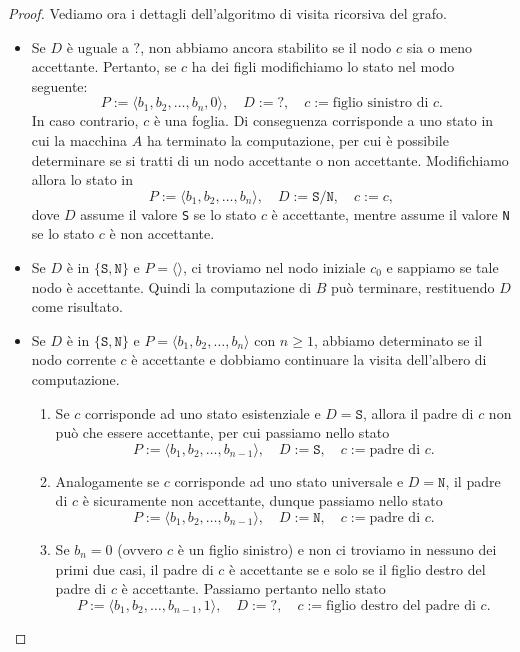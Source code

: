 \begin{proof}
 Vediamo ora i dettagli dell'algoritmo di visita ricorsiva del grafo.
 \begin{itemize}
  \item  Se $D$ è uguale a $\texttt{?}$, non abbiamo ancora stabilito se il nodo $c$ sia o meno
  accettante. Pertanto, se $c$ ha dei figli modifichiamo lo stato nel modo seguente:
  \[ P := \langle b_1, b_2, \ldots, b_n, 0 \rangle, \quad D := \texttt{?}, \quad c := \text{figlio sinistro di $c$}. \]
  In caso contrario, $c$ è una foglia. Di conseguenza corrisponde a uno stato in cui la macchina $A$
  ha terminato la computazione, per cui è possibile determinare se si tratti di un
  nodo accettante o non accettante. Modifichiamo allora lo stato in
  \[ P := \langle b_1, b_2, \ldots, b_n \rangle, \quad D := \texttt{S}/\texttt{N}, \quad c := c, \]
  dove $D$ assume il valore \texttt{S} se lo stato $c$ è accettante, mentre assume il valore \texttt{N} se lo stato $c$
  è non accettante.
  
  \item Se $D$ è in $\{\texttt{S}, \texttt{N}\}$ e $P=\langle\rangle$, ci troviamo nel nodo iniziale $c_0$ e sappiamo se tale nodo è accettante. Quindi la computazione di $B$ può terminare, restituendo $D$ come risultato.
  
  \item Se $D$ è in $\{\texttt{S}, \texttt{N}\}$ e $P=\langle b_1, b_2, \ldots, b_n\rangle$ con $n\geq 1$, abbiamo determinato se il nodo corrente $c$ è accettante e dobbiamo continuare la visita dell'albero di computazione.
  \begin{enumerate}
    \item Se $c$ corrisponde ad uno stato esistenziale e $D=\texttt{S}$, allora il padre di $c$ non può che essere accettante, per cui passiamo nello stato
    \[ P := \langle b_1, b_2, \ldots, b_{n-1} \rangle, \quad D := \texttt{S}, \quad c := \text{padre di $c$}. \]
    
    \item Analogamente se $c$ corrisponde ad uno stato universale e $D=\texttt{N}$, il padre di $c$ è sicuramente non accettante, dunque passiamo nello stato
    \[ P := \langle b_1, b_2, \ldots, b_{n-1} \rangle, \quad D := \texttt{N}, \quad c := \text{padre di $c$}. \]
    
    \item Se $b_n=0$ (ovvero $c$ è un figlio sinistro) e non ci troviamo in nessuno dei primi due casi,
    il padre di $c$ è accettante se e solo se il figlio destro del padre di $c$ è accettante.
    Passiamo pertanto nello stato
    \[ P := \langle b_1, b_2, \ldots, b_{n-1}, 1 \rangle, \quad D := \texttt{?}, \quad c := \text{figlio destro del padre di $c$}. \]
    

\end{enumerate}
\end{itemize}
\end{proof}
